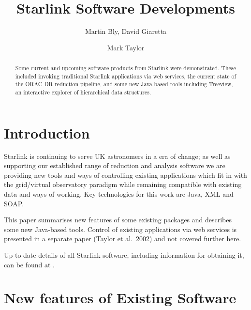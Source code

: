 



\title{Starlink Software Developments}

\author{Martin Bly, David Giaretta}

\author{Mark Taylor}




\begin{abstract}
Some current and upcoming software products from Starlink were demonstrated.
These included invoking traditional Starlink applications via
web services, the current state of the ORAC-DR reduction pipeline,
and some new Java-based tools including Treeview, an
interactive explorer of hierarchical data structures.
\end{abstract}

\section{Introduction}

Starlink is continuing to serve UK astronomers in a era of change;
as well as supporting our established range of reduction and analysis
software we are providing new tools and ways of controlling existing
applications which fit in with the grid/virtual observatory paradigm
while remaining compatible with existing data and ways of working.
Key technologies for this work are Java, XML and SOAP.

This paper summarises new features of some existing packages and
describes some new Java-based tools.
Control of existing applications via web services is presented
in a separate paper (Taylor et al.\ 2002) and not covered further here.

Up to date details of all Starlink software, including information for
obtaining it, can be found at 
.

\section{New features of Existing Software}

